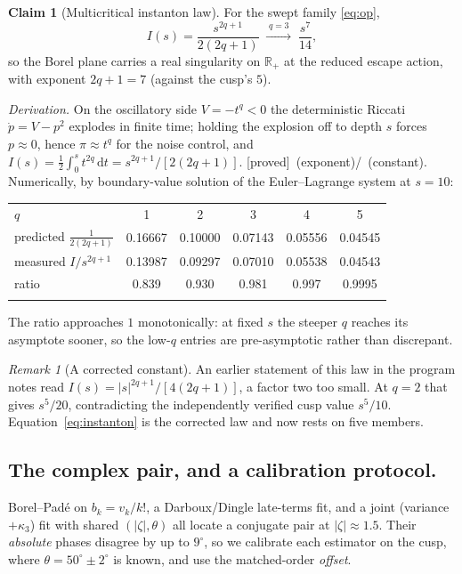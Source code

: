 \documentclass[11pt,reqno]{amsart}
\theoremstyle{plain}
\theoremstyle{definition}
\newtheorem{claim}[theorem]{Claim}
\theoremstyle{remark}
\newtheorem{remark}[theorem]{Remark}
\newcommand{\dd}{\,\mathrm{d}}
\newcommand{\R}{\mathbb{R}}
\newcommand{\tagP}{{\footnotesize\textsf{[proved]}}}
\newcommand{\tagN}{{\footnotesize\textsf{[numerical]}}}
\begin{document}
\begin{claim}[Multicritical instanton law]\label{claim:instanton}
For the swept family \eqref{eq:op},
\begin{equation}\label{eq:instanton}
I(s)=\frac{s^{2q+1}}{2(2q+1)}\;\xrightarrow{\;q=3\;}\;\frac{s^{7}}{14},
\end{equation}
so the Borel plane carries a real singularity on $\R_+$ at the reduced escape action, with exponent
$2q+1=7$ (against the cusp's $5$).
\end{claim}

\emph{Derivation.} On the oscillatory side $V=-t^q<0$ the deterministic Riccati $\dot p=V-p^2$
explodes in finite time; holding the explosion off to depth $s$ forces $p\approx0$, hence
$\pi\approx t^q$ for the noise control, and $I(s)=\tfrac12\int_0^st^{2q}\dd t=s^{2q+1}/[2(2q+1)]$.
\tagP\ (exponent)\;/\;\tagN\ (constant). Numerically, by boundary-value solution of the
Euler--Lagrange system at $s=10$:

\begin{center}
\begin{tabular}{lccccc}
\hline\noalign{\smallskip}
$q$ & 1 & 2 & 3 & 4 & 5\\
\noalign{\smallskip}\hline\noalign{\smallskip}
predicted $\tfrac1{2(2q+1)}$ & 0.16667 & 0.10000 & 0.07143 & 0.05556 & 0.04545\\
measured $I/s^{2q+1}$        & 0.13987 & 0.09297 & 0.07010 & 0.05538 & 0.04543\\
ratio                        & 0.839 & 0.930 & 0.981 & 0.997 & 0.9995\\
\noalign{\smallskip}\hline
\end{tabular}
\end{center}

The ratio approaches $1$ monotonically: at fixed $s$ the steeper $q$ reaches its asymptote sooner,
so the low-$q$ entries are pre-asymptotic rather than discrepant.

\begin{remark}[A corrected constant]\label{rem:correction}
An earlier statement of this law in the program notes read $I(s)=|s|^{2q+1}/[4(2q+1)]$, a factor two
too small. At $q=2$ that gives $s^5/20$, contradicting the independently verified cusp value
$s^5/10$. Equation~\eqref{eq:instanton} is the corrected law and now rests on five members.
\end{remark}

\subsection{The complex pair, and a calibration protocol.}
Borel--Pad\'e on $b_k=v_k/k!$, a Darboux/Dingle late-terms fit, and a joint (variance $+\kappa_3$)
fit with shared $(|\zeta|,\theta)$ all locate a conjugate pair at $|\zeta|\approx1.5$. Their
\emph{absolute} phases disagree by up to $9^\circ$, so we calibrate each estimator on the cusp,
where $\theta=50^\circ\pm2^\circ$ is known, and use the matched-order \emph{offset}.
\end{document}
